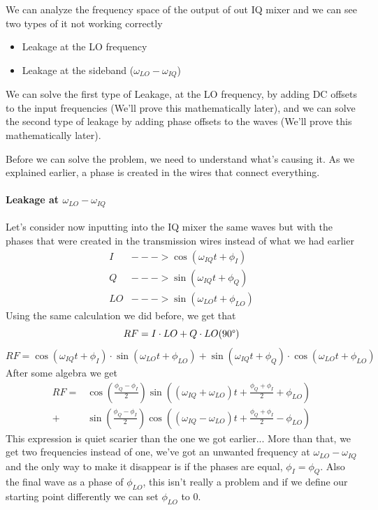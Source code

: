 We can analyze the frequency space of the output of out IQ mixer and we can see two types of it not working correctly
\begin{itemize}
  \item Leakage at the LO frequency
  \item Leakage at the sideband ($\omega_{LO} - \omega_{IQ}$)
\end{itemize}
We can solve the first type of Leakage, at the LO frequency, by adding DC offsets to the input frequencies (We'll prove this mathematically later), and we can solve the second type of leakage by adding phase offsets to the waves (We'll prove this mathematically later).


Before we can solve the problem, we need to understand what's causing it. As we explained earlier, a phase  is created  in the wires that connect everything.
\paragraph*{Leakage at $\omega_{LO} - \omega_{IQ}$ }
Let's consider now inputting into the IQ mixer the same waves but with the phases that were created in the transmission wires instead of what we had earlier
\begin{align*}
    I &---> \cos (\omega_{IQ} t + \phi_I) \\%
    Q &---> \sin (\omega_{IQ} t + \phi_Q) \\%
    LO &---> \sin (\omega_{LO}t + \phi_{LO})
\end{align*}
Using the same calculation we did before, we get that
$$RF = I\cdot LO + Q\cdot LO (90\degree)$$
\[
RF = \cos (\omega_{IQ} t + \phi_I) \cdot \sin (\omega_{LO}t + \phi_{LO}) + \sin (\omega_{IQ} t + \phi_Q) \cdot \cos (\omega_{LO}t + \phi_{LO}) 
\]
After some algebra we get
\begin{align*}
RF = &\cos (\frac{\phi_Q - \phi_I}{2})\sin ( (\omega_{IQ} + \omega_{LO})t + \frac{\phi_Q + \phi_I}{2} + \phi_{LO}) \\
   + &\sin (\frac{\phi_Q - \phi_I}{2})\cos ( (\omega_{IQ} - \omega_{LO})t + \frac{\phi_Q + \phi_I}{2} - \phi_{LO})
\end{align*}
This expression is quiet scarier than the one we got earlier... More than that, we get two frequencies instead of one, we've got an unwanted frequency at $\omega_{LO} - \omega_{IQ}$ and the only way to make it disappear is if the phases are equal, $\phi_I = \phi_Q$. Also the final wave as a phase of $\phi_{LO}$, this isn't really a problem and if we define our starting point differently we can set  $\phi_{LO}$ to 0.

